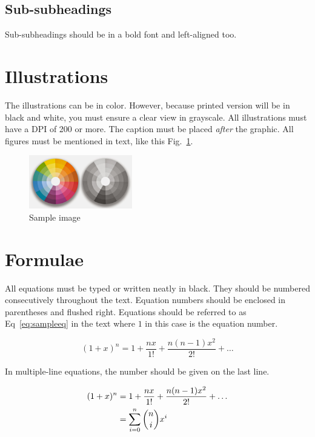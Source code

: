 \documentclass{jcst}
\begin{document}
\subsection{Sub-subheadings}
Sub-subheadings should be in a bold font and left-aligned too.

\section{Illustrations}

The illustrations can be in color. However, because printed version will be in
 black and white, you must ensure a clear view in grayscale. All illustrations
must have a DPI of 200 or more. The caption must be placed \textit{after} the
 graphic. All figures must be mentioned in text, like this Fig.~\ref{fig:sampleimage}.

\begin{figure}[ht]
\centering
\includegraphics[width=0.4\textwidth]{colors}
\caption{\label{fig:sampleimage}Sample image}
\end{figure}

\section{Formulae}
All equations must be typed or written neatly in black. They should be numbered
consecutively throughout the text. Equation numbers should be enclosed in
parentheses and flushed right. Equations should be referred to as Eq~\eqref{eq:sampleeq}
in the text where $1$ in this case is the equation number.

 \begin{equation}
   \label{eq:sampleeq}
   (1+x)^n=1+\frac{nx}{1!}+\frac{n (n-1) x^2}{2!}+\dots
 \end{equation}

 In multiple-line equations, the number should be given on the last line.

\begin{align}
\label{eq:aligned}
(1+x)^n&=1+\frac{nx}{1!}+\frac{n (n-1) x^2}{2!}+\dots \notag
      \\&=\sum_{i=0}^{n} {n\choose i} x^i
 \end{align}
\end{document}
